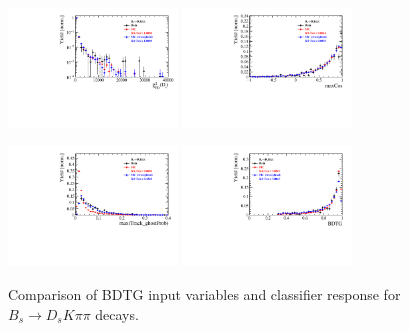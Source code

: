 \begin{figure}[h]
\includegraphics[height=!,width=0.4\textwidth]{figs/dataVsMC/signal_final/combined/Ds2KKpi_1_Ds_FDCHI2_ORIVX.pdf}
\includegraphics[height=!,width=0.4\textwidth]{figs/dataVsMC/signal_final/combined/Ds2KKpi_1_maxCos.pdf}

\includegraphics[height=!,width=0.4\textwidth]{figs/dataVsMC/signal_final/combined/Ds2KKpi_1_max_ghostProb.pdf}
\includegraphics[height=!,width=0.4\textwidth]{figs/dataVsMC/signal_final/combined/Ds2KKpi_1_BDTG_response.pdf}

\caption{Comparison of BDTG input variables and classifier response for $B_s\to D_sK\pi\pi$ decays.}
\label{fig:}
\end{figure}
